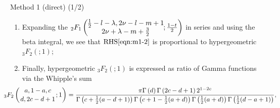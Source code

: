 \documentclass[pdf,notes]{beamer}
\begin{document}
\begin{frame}{Method 1 (direct) (1/2)}
\begin{enumerate}
			\vspace{-0.5cm}
	\item Expanding the ${}_2 F_1 \left( \kern-0.2cm\begin{array}{c}
					\frac{1}{2}-l-\lambda, 2\nu-l-m+1\\
					2 \nu+\lambda-m+\frac{3}{2}
				\end{array}\kern-0.2cm ; \frac{1 - t}{2} \right)$ in series and using the beta integral, we see that $\mbox{RHS}\eqref{eqn:m1-2}$
				is proportional to hypergeometric ${}_3F_2(;1)$;
			\item Finally, hypergeometric ${}_3F_2(;1)$ is expressed as ratio of Gamma functions via the Whipple's sum
			\vspace{-0.2cm}
			\begin{equation*}
		\kern-1cm{}_{3}F_{2}\left({a,1-a,c\atop d,2c-d+1};1\right)=\frac{\pi\Gamma\left(d%
				\right)\Gamma\left(2c-d+1\right)2^{1-2c}}{\Gamma\left(c+\frac{1}{2}(a-d+1)%
				\right)\Gamma\left(c+1-\frac{1}{2}(a+d)\right)\Gamma\left(\frac{1}{2}(a+d)%
			\right)\Gamma\left(\frac{1}{2}(d-a+1)\right)},
		\end{equation*}
	\end{enumerate}
\end{frame}
\end{document}
